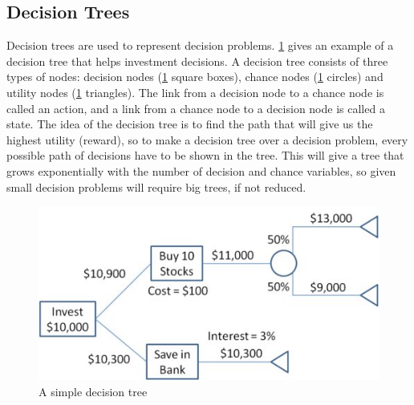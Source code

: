 \subsection{Decision Trees}
Decision trees are used to represent decision problems. \ref{fig:basicdecisiontree} gives an example of a decision tree that helps investment decisions. A decision tree consists of three types of nodes: decision nodes (\ref{fig:basicdecisiontree} square boxes), chance nodes (\ref{fig:basicdecisiontree} circles) and utility nodes (\ref{fig:basicdecisiontree} triangles). The link from a decision node to a chance node is called an action, and a link from a chance node to a decision node is called a state. The idea of the decision tree is to find the path that will give us the highest utility (reward), so to make a decision tree over a decision problem, every possible path of decisions have to be shown in the tree. This will give a tree that grows exponentially with the number of decision and chance variables, so given small decision problems will require big trees, if not reduced. 
	
\begin{figure}[H]
\includegraphics[scale=.8]{Figures/BayesianPictures/SimpleDecisionTree.png}
\caption{A simple decision tree \cite{sdt}}
\label{fig:basicdecisiontree}
\end{figure}

